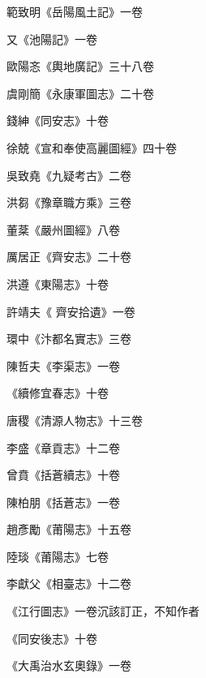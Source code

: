 \begin{pinyinscope}
 範致明《岳陽風土記》一卷



 又《池陽記》一卷



 歐陽忞《輿地廣記》三十八卷



 虞剛簡《永康軍圖志》二十卷



 錢紳《同安志》十卷



 徐兢《宣和奉使高麗圖經》四十卷



 吳致堯《九疑考古》二卷



 洪芻《豫章職方乘》三卷



 董棻《嚴州圖經》八卷



 厲居正《齊安志》二十卷



 洪遵《東陽志》十卷



 許靖夫《
 齊安拾遺》一卷



 環中《汴都名實志》三卷



 陳哲夫《李渠志》一卷



 《續修宜春志》十卷



 唐稷《清源人物志》十三卷



 李盛《章貢志》十二卷



 曾賁《括蒼續志》十卷



 陳柏朋《括蒼志》一卷



 趙彥勵《莆陽志》十五卷



 陸琰《莆陽志》七卷



 李獻父《相臺志》十二卷



 《江行圖志》一卷沉該訂正，不知作者



 《同安後志》十卷



 《大禹治水玄奧錄》一卷




\end{pinyinscope}
